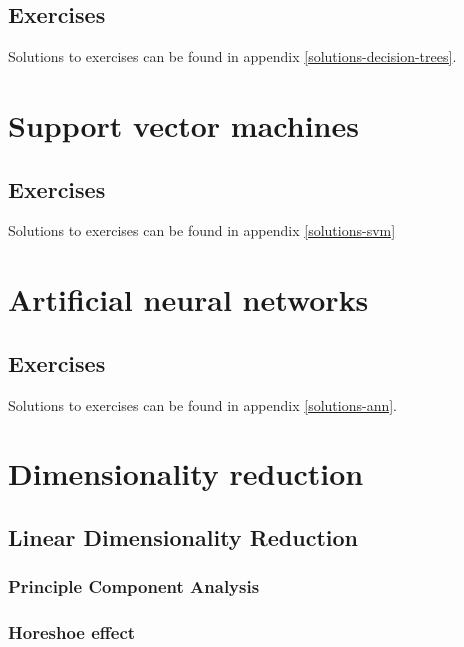 \documentclass[]{book}
\theoremstyle{definition}
\theoremstyle{definition}
\theoremstyle{definition}
\theoremstyle{remark}
\begin{document}
\section{Exercises}\label{exercises-3}

Solutions to exercises can be found in appendix
\ref{solutions-decision-trees}.

\chapter{Support vector machines}\label{svm}

\section{Exercises}\label{exercises-4}

Solutions to exercises can be found in appendix \ref{solutions-svm}

\chapter{Artificial neural networks}\label{ann}

\section{Exercises}\label{exercises-5}

Solutions to exercises can be found in appendix \ref{solutions-ann}.

\chapter{Dimensionality reduction}\label{dimensionality-reduction}

\section{Linear Dimensionality
Reduction}\label{linear-dimensionality-reduction}

\subsection{Principle Component
Analysis}\label{principle-component-analysis}

\subsection{Horeshoe effect}\label{horeshoe-effect}
\end{document}
